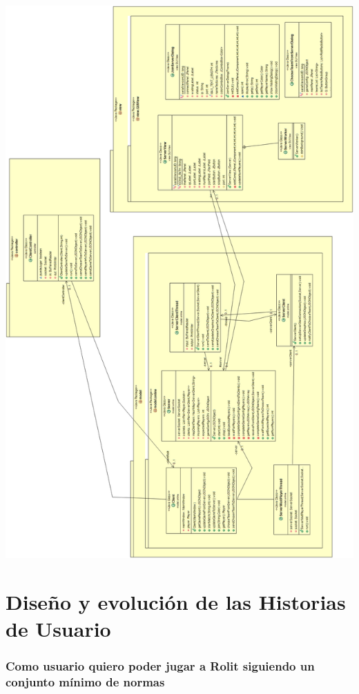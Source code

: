 \documentclass[../DocumentoOficial.tex]{subfiles}
\begin{document}
\begin{center}
\includegraphics[scale=0.4]{mvconlineuml.png} 
\end{center}

\chapter{Diseño y evolución de las Historias de Usuario}

\subsection{Como usuario quiero poder jugar a Rolit siguiendo un conjunto mínimo de normas}
\end{document}
